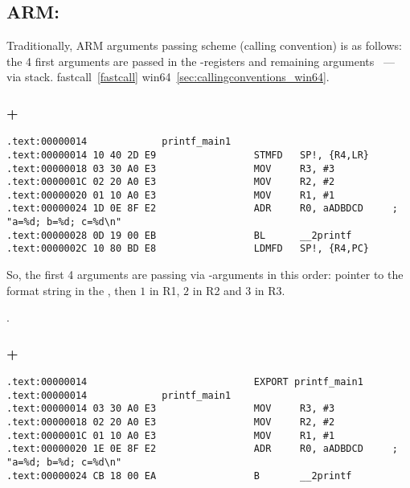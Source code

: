 ﻿\subsection{ARM: }

{Traditionally, ARM arguments passing scheme (calling convention) is as follows:
the 4 first arguments are passed in the \Rzero-\Rthree registers and remaining arguments ~--- via stack}.
fastcall~\ref{fastcall} \OrENRU win64~\ref{sec:callingconventions_win64}.

\subsubsection{\NonOptimizingKeil + \ARMMode}

\begin{lstlisting}[caption=\NonOptimizingKeil + \ARMMode]
.text:00000014             printf_main1
.text:00000014 10 40 2D E9                 STMFD   SP!, {R4,LR}
.text:00000018 03 30 A0 E3                 MOV     R3, #3
.text:0000001C 02 20 A0 E3                 MOV     R2, #2
.text:00000020 01 10 A0 E3                 MOV     R1, #1
.text:00000024 1D 0E 8F E2                 ADR     R0, aADBDCD     ; "a=%d; b=%d; c=%d\n"
.text:00000028 0D 19 00 EB                 BL      __2printf
.text:0000002C 10 80 BD E8                 LDMFD   SP!, {R4,PC}
\end{lstlisting}

{So, the first 4 arguments are passing via \Rzero-\Rzero arguments in this order:
pointer to the \printf format string in the \Rzero, then $1$ in R1, $2$ in R2 and $3$ in R3}.

.

\subsubsection{\OptimizingKeil + \ARMMode}
\label{ARM_B_to_printf}

\begin{lstlisting}[caption=\OptimizingKeil + \ARMMode]
.text:00000014                             EXPORT printf_main1
.text:00000014             printf_main1
.text:00000014 03 30 A0 E3                 MOV     R3, #3
.text:00000018 02 20 A0 E3                 MOV     R2, #2
.text:0000001C 01 10 A0 E3                 MOV     R1, #1
.text:00000020 1E 0E 8F E2                 ADR     R0, aADBDCD     ; "a=%d; b=%d; c=%d\n"
.text:00000024 CB 18 00 EA                 B       __2printf
\end{lstlisting}

